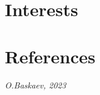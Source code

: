 \documentclass[11pt,a4paper,sans]{moderncv}
\begin{document}
\section{Interests}


\section{References}
\begin{cvcolumns}

\end{cvcolumns}

\vfill
\emptysection{}\closesection
\vfill
\begin{center}
\textit{\small O.Baskaev, 2023}
\end{center}


\clearpage
\end{document}
